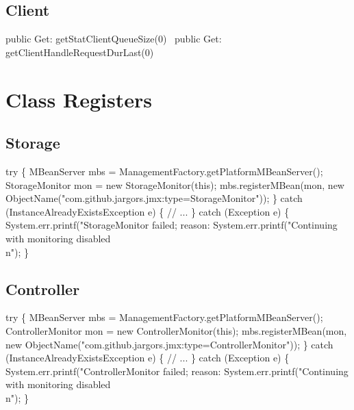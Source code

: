 \subsection{Client}
\nwenddocs{}\plusendmoddef
public \LA{}Get: getStatClientQueueSize(0)~{\nwtagstyle{}}\RA{}
public \LA{}Get: getClientHandleRequestDurLast(0)~{\nwtagstyle{}}\RA{}
\nwendcode{}\nwdocspar

\section{Class Registers}
\subsection{Storage}
\nwenddocs{}\endmoddef{}
try \{
  MBeanServer mbs = ManagementFactory.getPlatformMBeanServer();
  StorageMonitor mon = new StorageMonitor(this);
  mbs.registerMBean(mon, new ObjectName("com.github.jargors.jmx:type=StorageMonitor"));
\} catch (InstanceAlreadyExistsException e) \{
  // ...
\} catch (Exception e) \{
  System.err.printf("StorageMonitor failed; reason: %
  System.err.printf("Continuing with monitoring disabled\\n");
\}
\nwendcode{}\nwdocspar

\subsection{Controller}
\nwenddocs{}\endmoddef{}
try \{
  MBeanServer mbs = ManagementFactory.getPlatformMBeanServer();
  ControllerMonitor mon = new ControllerMonitor(this);
  mbs.registerMBean(mon, new ObjectName("com.github.jargors.jmx:type=ControllerMonitor"));
\} catch (InstanceAlreadyExistsException e) \{
  // ...
\} catch (Exception e) \{
  System.err.printf("ControllerMonitor failed; reason: %
  System.err.printf("Continuing with monitoring disabled\\n");
\}
\nwendcode{}\nwdocspar

